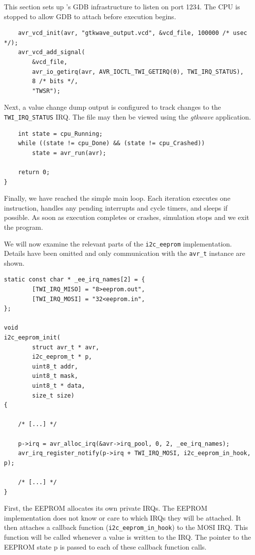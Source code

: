 This section sets up \simavr's \ac{GDB} infrastructure to listen on port 1234. The
\ac{CPU} is stopped to allow \ac{GDB} to attach before execution begins.

\begin{lstlisting}
    avr_vcd_init(avr, "gtkwave_output.vcd", &vcd_file, 100000 /* usec */);
    avr_vcd_add_signal(
        &vcd_file,
        avr_io_getirq(avr, AVR_IOCTL_TWI_GETIRQ(0), TWI_IRQ_STATUS),
        8 /* bits */,
        "TWSR");
\end{lstlisting}

Next, a value change dump output is configured to track changes to the
\lstinline|TWI_IRQ_STATUS| \ac{IRQ}. The file may then be viewed using the \emph{gtkwave}
application.

\begin{lstlisting}
    int state = cpu_Running;
    while ((state != cpu_Done) && (state != cpu_Crashed))
        state = avr_run(avr);

    return 0;
}
\end{lstlisting}

Finally, we have reached the simple main loop. Each iteration executes one
instruction, handles any pending interrupts and cycle timers, and sleeps if
possible. As soon as execution completes or crashes, simulation stops and we
exit the program.

We will now examine the relevant parts of the \lstinline|i2c_eeprom| implementation.
Details have been omitted and only communication with the \lstinline|avr_t| instance are
shown.

\begin{lstlisting}
static const char * _ee_irq_names[2] = {
		[TWI_IRQ_MISO] = "8>eeprom.out",
		[TWI_IRQ_MOSI] = "32<eeprom.in",
};

void
i2c_eeprom_init(
		struct avr_t * avr,
		i2c_eeprom_t * p,
		uint8_t addr,
		uint8_t mask,
		uint8_t * data,
		size_t size)
{

    /* [...] */

	p->irq = avr_alloc_irq(&avr->irq_pool, 0, 2, _ee_irq_names);
	avr_irq_register_notify(p->irq + TWI_IRQ_MOSI, i2c_eeprom_in_hook, p);

    /* [...] */
}
\end{lstlisting}

First, the \ac{EEPROM} allocates its own private \acp{IRQ}. The \ac{EEPROM} implementation
does not know or care to which \simavr \acp{IRQ} they will be attached. It then
attaches a callback function (\lstinline|i2c_eeprom_in_hook|) to the \ac{MOSI} \ac{IRQ}. This
function will be called whenever a value is written to the \ac{IRQ}. The pointer to
the \ac{EEPROM} state p is passed to each of these callback function calls.

